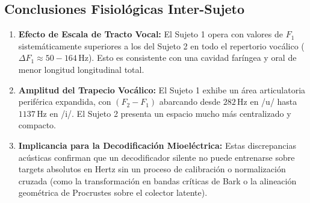 \documentclass[11pt,a4paper]{article}
\begin{document}
\subsection{Conclusiones Fisiológicas Inter-Sujeto}
\begin{enumerate}
    \item \textbf{Efecto de Escala de Tracto Vocal:} El Sujeto 1 opera con valores de $F_1$ sistemáticamente superiores a los del Sujeto 2 en todo el repertorio vocálico ($\Delta F_1 \approx 50 - 164\,\text{Hz}$). Esto es consistente con una cavidad faríngea y oral de menor longitud longitudinal total.
    \item \textbf{Amplitud del Trapecio Vocálico:} El Sujeto 1 exhibe un área articulatoria periférica expandida, con $(F_2 - F_1)$ abarcando desde $282\,\text{Hz}$ en /u/ hasta $1137\,\text{Hz}$ en /i/. El Sujeto 2 presenta un espacio mucho más centralizado y compacto.
    \item \textbf{Implicancia para la Decodificación Mioeléctrica:} Estas discrepancias acústicas confirman que un decodificador silente no puede entrenarse sobre targets absolutos en Hertz sin un proceso de calibración o normalización cruzada (como la transformación en bandas críticas de Bark o la alineación geométrica de Procrustes sobre el colector latente).
\end{enumerate}
\end{document}
